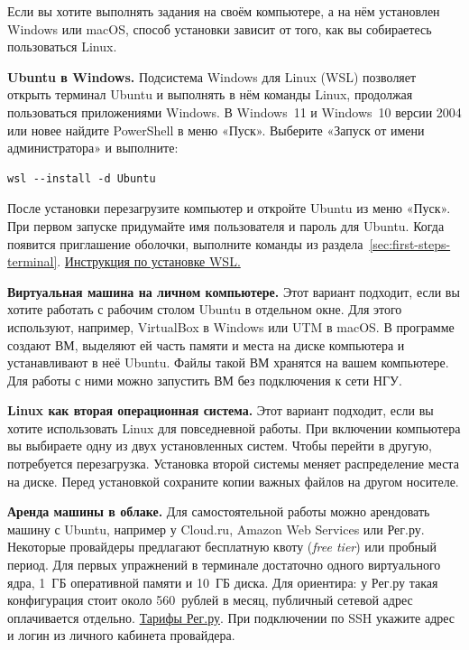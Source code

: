Если вы хотите выполнять задания на своём компьютере, а на нём установлен
Windows или macOS, способ установки зависит от того, как вы собираетесь
пользоваться Linux.

\textbf{Ubuntu в Windows.} Подсистема Windows для Linux (WSL) позволяет
открыть терминал Ubuntu и выполнять в нём команды Linux, продолжая
пользоваться приложениями Windows. В Windows~11 и Windows~10 версии 2004
или новее найдите PowerShell в меню «Пуск». Выберите «Запуск от имени
администратора» и выполните:
\begin{verbatim}
wsl --install -d Ubuntu
\end{verbatim}
После установки перезагрузите компьютер и откройте Ubuntu из меню «Пуск».
При первом запуске придумайте имя пользователя и пароль для Ubuntu.
Когда появится приглашение оболочки, выполните команды из
раздела~\ref{sec:first-steps-terminal}.
\href{https://learn.microsoft.com/ru-ru/windows/wsl/install}{Инструкция по установке WSL.}

\textbf{Виртуальная машина на личном компьютере.} Этот вариант подходит,
если вы хотите работать с рабочим столом Ubuntu в отдельном окне.
Для этого используют, например, VirtualBox в Windows или UTM в macOS.
В программе создают ВМ, выделяют ей часть памяти и места на диске
компьютера и устанавливают в неё Ubuntu. Файлы такой ВМ хранятся на
вашем компьютере. Для работы с ними можно запустить ВМ без подключения
к сети НГУ.

\textbf{Linux как вторая операционная система.} Этот вариант подходит,
если вы хотите использовать Linux для повседневной работы. При включении
компьютера вы выбираете одну из двух установленных систем. Чтобы
перейти в другую, потребуется перезагрузка. Установка второй системы
меняет распределение места на диске. Перед установкой сохраните копии
важных файлов на другом носителе.

\textbf{Аренда машины в облаке.} Для самостоятельной работы можно
арендовать машину с Ubuntu, например у Cloud.ru, Amazon Web Services
или Рег.ру. Некоторые провайдеры предлагают бесплатную квоту
(\emph{free tier}) или пробный период. Для первых упражнений в терминале
достаточно одного виртуального ядра, 1~ГБ оперативной памяти и 10~ГБ диска.
Для ориентира: у Рег.ру такая конфигурация стоит около 560~рублей в месяц,
публичный сетевой адрес оплачивается отдельно.
\href{https://www.reg.ru/vps/}{Тарифы Рег.ру}.
При подключении по SSH укажите адрес и логин из личного кабинета
провайдера.
